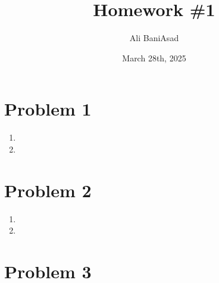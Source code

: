 \documentclass[12]{fphw}
\title{Homework \#1} %
\author{Ali BaniAsad} %
\date{March 28th, 2025} %
\institute{Sharif University of Technology \\ Institute of Aerospace} %
\begin{document}
	
	\maketitle %
	\section*{Problem 1}
	\begin{enumerate}[label=(\alph*)]
		\item 
		
		\item 
		
	\end{enumerate}
	\section*{Problem 2}
	\begin{enumerate}[label=(\alph*)]
		\item 
		
		\item 
		
	\end{enumerate}
	\section*{Problem 3}
	

	
\end{document}
